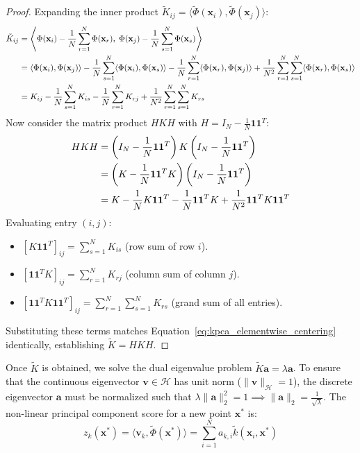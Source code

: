 \begin{proof}
Expanding the inner product $\tilde{K}_{ij} = \langle \tilde{\Phi}(\mathbf{x}_i), \tilde{\Phi}(\mathbf{x}_j) \rangle$:
\begin{align}
\tilde{K}_{ij} &= \left\langle \Phi(\mathbf{x}_i) - \frac{1}{N}\sum_{r=1}^N \Phi(\mathbf{x}_r), \; \Phi(\mathbf{x}_j) - \frac{1}{N}\sum_{s=1}^N \Phi(\mathbf{x}_s) \right\rangle \notag \\
&= \langle \Phi(\mathbf{x}_i), \Phi(\mathbf{x}_j) \rangle - \frac{1}{N}\sum_{s=1}^N \langle \Phi(\mathbf{x}_i), \Phi(\mathbf{x}_s) \rangle - \frac{1}{N}\sum_{r=1}^N \langle \Phi(\mathbf{x}_r), \Phi(\mathbf{x}_j) \rangle + \frac{1}{N^2}\sum_{r=1}^N \sum_{s=1}^N \langle \Phi(\mathbf{x}_r), \Phi(\mathbf{x}_s) \rangle \notag \\
&= K_{ij} - \frac{1}{N}\sum_{s=1}^N K_{is} - \frac{1}{N}\sum_{r=1}^N K_{rj} + \frac{1}{N^2}\sum_{r=1}^N \sum_{s=1}^N K_{rs}
\label{eq:kpca_elementwise_centering}
\end{align}
Now consider the matrix product $H K H$ with $H = I_N - \frac{1}{N}\mathbf{1}\mathbf{1}^T$:
\begin{align}
H K H &= \left(I_N - \frac{1}{N}\mathbf{1}\mathbf{1}^T\right) K \left(I_N - \frac{1}{N}\mathbf{1}\mathbf{1}^T\right) \notag \\
&= \left(K - \frac{1}{N}\mathbf{1}\mathbf{1}^T K\right) \left(I_N - \frac{1}{N}\mathbf{1}\mathbf{1}^T\right) \notag \\
&= K - \frac{1}{N} K \mathbf{1}\mathbf{1}^T - \frac{1}{N}\mathbf{1}\mathbf{1}^T K + \frac{1}{N^2}\mathbf{1}\mathbf{1}^T K \mathbf{1}\mathbf{1}^T
\end{align}
Evaluating entry $(i, j)$:
\begin{itemize}
    \item $[K \mathbf{1}\mathbf{1}^T]_{ij} = \sum_{s=1}^N K_{is}$ (row sum of row $i$).
    \item $[\mathbf{1}\mathbf{1}^T K]_{ij} = \sum_{r=1}^N K_{rj}$ (column sum of column $j$).
    \item $[\mathbf{1}\mathbf{1}^T K \mathbf{1}\mathbf{1}^T]_{ij} = \sum_{r=1}^N \sum_{s=1}^N K_{rs}$ (grand sum of all entries).
\end{itemize}
Substituting these terms matches Equation~\eqref{eq:kpca_elementwise_centering} identically, establishing $\tilde{K} = H K H$.
\end{proof}

Once $\tilde{K}$ is obtained, we solve the dual eigenvalue problem $\tilde{K}\mathbf{a} = \lambda \mathbf{a}$. To ensure that the continuous eigenvector $\mathbf{v} \in \mathcal{H}$ has unit norm ($\|\mathbf{v}\|_{\mathcal{H}} = 1$), the discrete eigenvector $\mathbf{a}$ must be normalized such that $\lambda \|\mathbf{a}\|_2^2 = 1 \implies \|\mathbf{a}\|_2 = \frac{1}{\sqrt{\lambda}}$.
The non-linear principal component score for a new point $\mathbf{x}^*$ is:
\begin{equation}
z_k(\mathbf{x}^*) = \langle \mathbf{v}_k, \tilde{\Phi}(\mathbf{x}^*) \rangle = \sum_{i=1}^N a_{k,i} \tilde{k}(\mathbf{x}_i, \mathbf{x}^*)
\end{equation}


